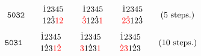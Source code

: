 \documentclass{article}
\begin{document}
\[
  \texttt{5032} \qquad
  \SeqCompare{\dot{1}2345}{12\dot{3}\textcolor{red}{12}} \qquad
  \SeqCompare{\dot{1}2345}{\textcolor{red}{\dot{3}}12\dot{3}\textcolor{red}{1}} \qquad
  \SeqCompare{\dot{1}2345}{\textcolor{red}{2\dot{3}}12\dot{3}} \qquad
  \text{(5 steps.)}
\]




\[
  \texttt{5031} \qquad
  \SeqCompare{\dot{1}2345}
    {1\dot{2}3\textcolor{red}{1\dot{2}}} \qquad
  \SeqCompare{\dot{1}2345}
    {\textcolor{red}{3}1\dot{2}3\textcolor{red}{1}} \qquad
  \SeqCompare{\dot{1}2345}
    {\textcolor{red}{\dot{2}3}1\dot{2}3} \qquad
  \text{(10 steps.)}
\]

\NewDocumentCommand{}
\end{document}
